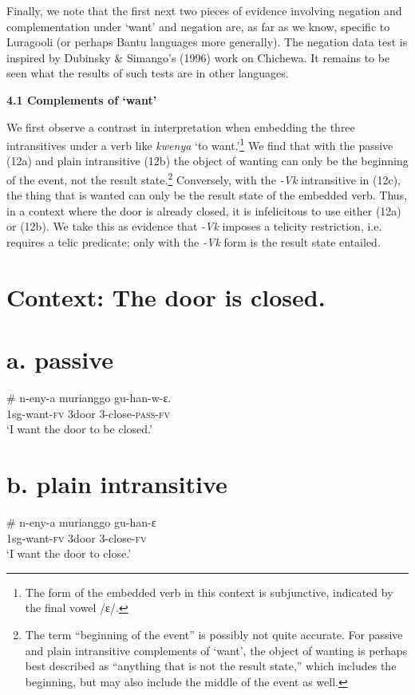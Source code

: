 \documentclass[output=paper]{langsci/langscibook}
\begin{document}
\begin{styleTabellenberschrift}
  Finally, we note that the first next two pieces of evidence involving negation and complementation under ‘want’ and negation are, as far as we know, specific to Luragooli (or perhaps Bantu languages more generally). The negation data test is inspired by Dubinsky \& Simango’s (1996) work on Chichewa. It remains to be seen what the results of such tests are in other languages. 

\textbf{4.1 Complements of ‘want’}

We first observe a contrast in interpretation when embedding the three intransitives under a verb like \textit{kwenya} ‘to want.’\footnote{ The form of the embedded verb in this context is subjunctive, indicated by the final vowel /ɛ/.} We find that with the passive (12a) and plain intransitive (12b) the object of wanting can only be the beginning of the event, not the result state.\footnote{ The term “beginning of the event” is possibly not quite accurate. For passive and plain intransitive complements of ‘want’, the object of wanting is perhaps best described as “anything that is not the result state,” which includes the beginning, but may also include the middle of the event as well. } Conversely, with the \textit{{}-Vk} intransitive in (12c), the thing that is wanted can only be the result state of the embedded verb. Thus, in a context where the door is already closed, it is infelicitous to use either (12a) or (12b). We take this as evidence that \textit{{}-Vk} imposes a telicity restriction, i.e. requires a telic predicate; only with the \textit{{}-Vk} form is the result state entailed.

\chapter{Context: The door is closed.}
\chapter[a. passive]{a. \textbf{passive}}
\gll   \# n-eny-a       murianggo gu-han-w-ɛ.\\
     \textit{  }1sg-want-\textsc{fv} 3door         3-close-\textsc{pass}{}-\textsc{fv}\\
\glt ‘I want the door to be closed.’
\z

\chapter[b. plain intransitive]{b. \textbf{plain intransitive}}
\gll \textbf{  }\# n-eny-a       murianggo gu-han-ɛ\\
     \textit{  }1sg-want-\textsc{fv} 3door        3-close-\textsc{fv}\\
\glt ‘I want the door to close.’
\z


\end{styleTabellenberschrift}
\end{document}
